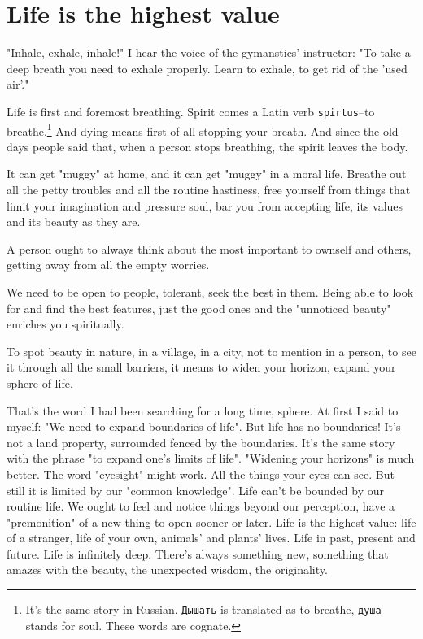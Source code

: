 \chapter{Life is the highest value}

"Inhale, exhale, inhale!" I hear the voice of the gymanstics' instructor: "To take a deep breath you need to exhale properly. Learn to exhale, to get rid of the 'used air'."

Life is first and foremost breathing. Spirit comes a Latin verb \texttt{spirtus}--to breathe.\footnote{It's the same story in Russian. \texttt{Дышать} is translated as to breathe, \texttt{душа} stands for soul. These words are cognate.} And dying means first of all stopping your breath. And since the old days people said that, when a person stops breathing, the spirit leaves the body. 

It can get "muggy" at home, and it can get "muggy" in a moral life. Breathe out all the petty troubles and all the routine hastiness, free yourself from things that limit your imagination and pressure soul, bar you from accepting life, its values and its beauty as they are.

A person ought to always think about the most important to ownself and others, getting away from all the empty worries.

We need to be open to people, tolerant, seek the best in them. Being able to look for and find the best features, just the good ones and the "unnoticed beauty" enriches you spiritually.

To spot beauty in nature, in a village, in a city, not to mention in a person, to see it through all the small barriers, it means to widen your horizon, expand your sphere of life.

That's the word I had been searching for a long time, sphere. At first I said to myself: "We need to expand boundaries of life". But life has no boundaries! It's not a land property, surrounded fenced by the boundaries. It's the same story with the phrase "to expand one's limits of life". "Widening your horizons" is much better. The word "eyesight" might work. All the things your eyes can see. But still it is limited by our "common knowledge". Life can't be bounded by our routine life. We ought to feel and notice things beyond our perception, have a "premonition" of a new thing to open sooner or later. Life is the highest value: life of a stranger, life of your own, animals' and plants' lives. Life in past, present and future. Life is infinitely deep. There's always something new, something that amazes with the beauty, the unexpected wisdom, the originality.